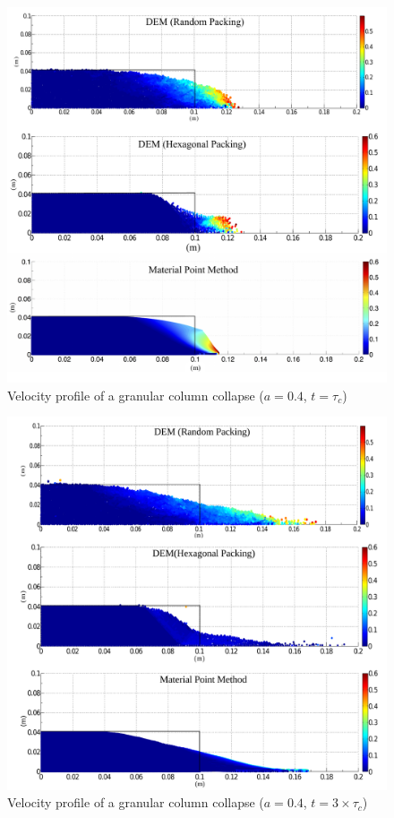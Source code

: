 \begin{figure}[tbhp]
\centering
\includegraphics[width=\textwidth]{a04tc}
\caption{Velocity profile of a granular column collapse ($a = 0.4$, 
$t=\tau_c$)}
\label{fig:a04tc}
\end{figure}

\begin{figure}[tbhp]
\centering
\includegraphics[width=\textwidth]{a04f}
\caption{Velocity profile of a granular column collapse ($a = 0.4$,  
$t=3\times\tau_c$)}
\label{fig:a04f}
\end{figure}


